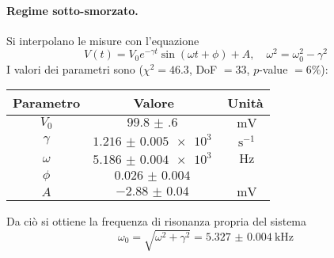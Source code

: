 \documentclass[a4paper]{article}
\begin{document}
\paragraph{Regime sotto-smorzato.}
Si interpolano le misure con l'equazione
\[
V(t)=V_0 e^{-\gamma t}\sin(\omega t+\phi)+A,\quad \omega^2=\omega_0^2-\gamma^2
\] 
I valori dei parametri sono ($\chi^2=46.3$, DoF $=33$, $p$-value $=6\%$): %
\begin{center}
\begin{tabular}[t]{c|c|c}
	Parametro & Valore & Unità \\\midrule
	$V_0$ & $\SI{99.8(6)}{}$ & $\SI{}{\mV}$\\
	$\gamma$ & $\SI{1.216(5)e+3}{}$ & $\SI{}{\s^{-1}}$\\
	$\omega$ & $\SI{5.186(4)e+3}{}$ & $\SI{}{\Hz}$\\
	$\phi$ & $\SI{0.026(4)}{}$ &\\
	$A$ & $\SI{-2.88(4)}{}$ & $\SI{}{\mV}$
\end{tabular}
\end{center}
Da ciò si ottiene la frequenza di risonanza propria del sistema
\[
\omega_0=\sqrt{\omega^2+\gamma^2} = \SI{5.327(4)}{\kHz}
\] 
\end{document}
